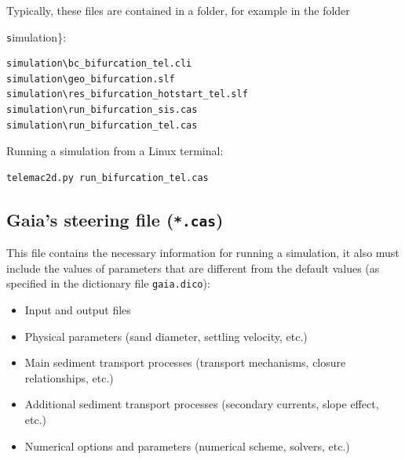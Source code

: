 Typically, these files are contained in a folder, for example in the folder {\texttt simulation\}:
\begin{footnotesize}
\begin{verbatim}
simulation\bc_bifurcation_tel.cli
simulation\geo_bifurcation.slf
simulation\res_bifurcation_hotstart_tel.slf
simulation\run_bifurcation_sis.cas
simulation\run_bifurcation_tel.cas
\end{verbatim}
\end{footnotesize}

Running a simulation from a Linux terminal:
\begin{footnotesize}
\begin{verbatim}
telemac2d.py run_bifurcation_tel.cas
\end{verbatim}
\end{footnotesize}

\subsection{Gaia's steering file (\texttt{*.cas})}
This file contains the necessary information for running a simulation, it also must include the values of parameters that are different from the default values (as specified in the dictionary file \texttt{gaia.dico}):
\begin{itemize}
\item Input and output files
\item Physical parameters (sand diameter, settling velocity, etc.)
\item Main sediment transport processes (transport mechanisms, closure relationships, etc.)
\item Additional sediment transport processes (secondary currents, slope effect, etc.)
\item Numerical options and parameters (numerical scheme, solvers, etc.)
\end{itemize}

\pagebreak

}
